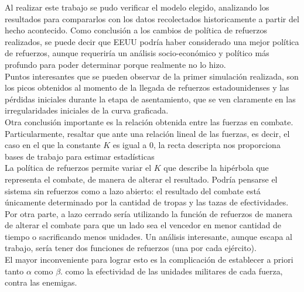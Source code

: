 \documentclass{sig-alternate}
\begin{document}
Al realizar este trabajo se pudo verificar el modelo elegido, analizando los resultados para compararlos con los datos recolectados historicamente
a partir del hecho acontecido. Como conclusión a los cambios de política de refuerzos realizados, se puede decir que EEUU podría haber considerado una
mejor política de refuerzos, aunque requeriría un análisis socio-económico y político más profundo para poder determinar porque realmente no
lo hizo.\\
Puntos interesantes que se pueden observar de la primer simulación realizada, son los picos obtenidos al momento de la llegada de refuerzos
estadounidenses y las pérdidas iniciales durante la etapa de asentamiento, que se ven claramente en las irregularidades iniciales de la curva 
graficada.\\
Otra conclusión importante es la relación obtenida entre las fuerzas en combate. Particularmente, resaltar que ante una relación lineal de las
fuerzas, es decir, el caso en el que la constante $K$ es igual a $0$, la recta descripta nos proporciona bases de trabajo para estimar estadísticas \\
La política de refuerzos permite variar el $K$ que describe la
hip\'erbola que representa el combate, de manera de alterar el
resultado. Podr\'ia pensarse el sistema sin refuerzos como a lazo
abierto: el resultado del combate está \'unicamente determinado
por la cantidad de tropas y las tazas de efectividades. Por otra
parte, a lazo cerrado ser\'ia utilizando la funci\'on de refuerzos de
manera de alterar el combate para que un lado sea el vencedor en menor
cantidad de tiempo o sacrificando menos unidades. Un análisis interesante, aunque escapa al trabajo, sería tener dos funciones de refuerzos (una por cada ejército). \\
El mayor inconveniente para lograr esto es la complicación de establecer a priori tanto $\alpha$ como $\beta$.
como la efectividad de las unidades militares de cada fuerza, contra las enemigas.
\end{document}
